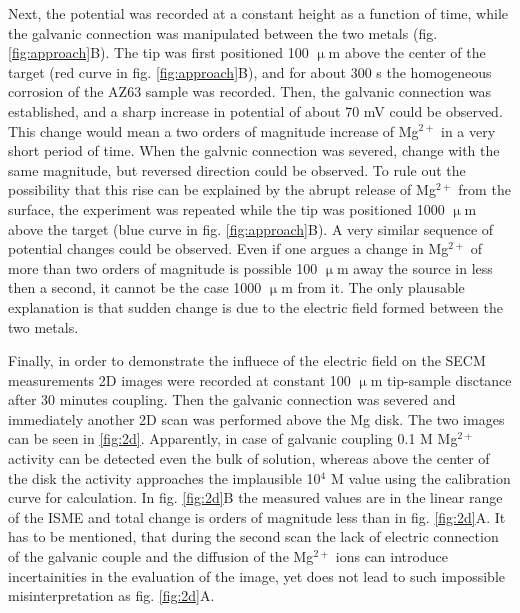 \documentclass[3p]{elsarticle}
\begin{document}
Next, the potential was recorded at a constant height as a function of time, while the galvanic connection was manipulated between the two metals (fig. \ref{fig:approach}B). The tip was first positioned 100 $\upmu$m above the center of the target (red curve in fig. \ref{fig:approach}B), and for about 300 s the homogeneous corrosion of the AZ63 sample was recorded. Then, the galvanic connection was established, and a sharp increase in potential of about 70 mV could be observed. This change would mean a two orders of magnitude increase of Mg$^{2+}$ in a very short period of time. When the galvnic connection was severed, change with the same magnitude, but reversed direction could be observed. To rule out the possibility that this rise can be explained by the abrupt release of Mg$^{2+}$ from the surface, the experiment was repeated while the tip was positioned 1000 $\upmu$m above the target (blue curve in fig. \ref{fig:approach}B). A very similar sequence of potential changes could be observed. Even if one argues a change in Mg$^{2+}$ of more than two orders of magnitude is possible 100 $\upmu$m away the source in less then a second, it cannot be the case 1000 $\upmu$m from it. The only plausable explanation is that sudden change is due to the electric field formed between the two metals. 

Finally, in order to demonstrate the influece of the electric field on the SECM measurements 2D images were recorded at constant 100 $\upmu$m tip-sample disctance after 30 minutes coupling. 
Then the galvanic connection was severed and immediately another 2D scan was performed above the Mg disk. The two images can be seen in \ref{fig:2d}. Apparently, in case of galvanic coupling 0.1 M Mg$^{2+}$ activity can be detected even the bulk of solution, whereas above the center of the disk the activity approaches the implausible 10$^{4}$ M value using the calibration curve for calculation.   
In fig. \ref{fig:2d}B the measured values are in the linear range of the ISME and total change is orders of magnitude less than in fig. \ref{fig:2d}A. It has to be mentioned, that during the second scan the lack of electric connection of the galvanic couple and the diffusion of the Mg$^{2+}$ ions can introduce incertainities in the evaluation of the image, yet does not lead to such impossible misinterpretation as fig. \ref{fig:2d}A.
\end{document}
